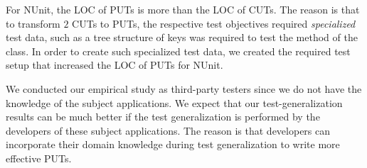 For NUnit, the LOC of PUTs is more than the LOC of CUTs. The reason is that to transform $2$ CUTs to PUTs, the respective test objectives required \textit{specialized} test data, such as a tree structure of keys was required to test the  method of the  class. In order to create such specialized test data, we created the required test setup that increased the LOC of PUTs for NUnit.

We conducted our empirical study as third-party testers since we do not have the knowledge of the subject applications. We expect that our test-generalization results can be much better if the test generalization is performed by the developers of these subject applications. The reason is that developers can incorporate their domain knowledge during test generalization to write more effective PUTs.



